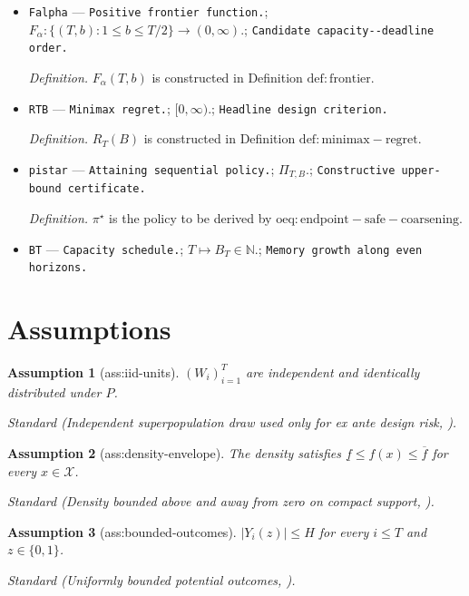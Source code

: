 \documentclass{article}
\newtheorem{assumption}{Assumption}
\begin{document}
\begin{itemize}
  \par\smallskip\noindent\emph{Definition.} \(\alpha=2\beta/d\).
  \item \texttt{Falpha} --- \texttt{Positive frontier function.}; \(F_\alpha:\{(T,b):1\le b\le T/2\}\to(0,\infty)\).; \texttt{Candidate capacity-\allowbreak{}-\allowbreak{}deadline order.}
  \par\smallskip\noindent\emph{Definition.} \(F_\alpha(T,b)\) is constructed in Definition \(\mathrm{def:frontier}\).
  \item \texttt{RTB} --- \texttt{Minimax regret.}; \([0,\infty)\).; \texttt{Headline design criterion.}
  \par\smallskip\noindent\emph{Definition.} \(R_T(B)\) is constructed in Definition \(\mathrm{def:minimax-regret}\).
  \item \texttt{pistar} --- \texttt{Attaining sequential policy.}; \(\Pi_{T,B}\).; \texttt{Constructive upper-\allowbreak{}bound certificate.}
  \par\smallskip\noindent\emph{Definition.} \(\pi^\star\) is the policy to be derived by \(\mathrm{oeq:endpoint-safe-coarsening}\).
  \item \texttt{BT} --- \texttt{Capacity schedule.}; \(T\mapsto B_T\in\mathbb N\).; \texttt{Memory growth along even horizons.}
\end{itemize}

\section{Assumptions}

\begin{assumption}[ass:iid-units]\label{ass:iid-units}
\((W_i)_{i=1}^T\) are independent and identically distributed under \(P\).
\par\smallskip\noindent\emph{Standard} (Independent superpopulation draw used only for ex ante design risk, \cite{bai2022optimality}).
\end{assumption}

\begin{assumption}[ass:density-envelope]\label{ass:density-envelope}
The density satisfies \(\underline f\le f(x)\le\overline f\) for every \(x\in\mathcal X\).
\par\smallskip\noindent\emph{Standard} (Density bounded above and away from zero on compact support, \cite{tsybakov2009introduction}).
\end{assumption}

\begin{assumption}[ass:bounded-outcomes]\label{ass:bounded-outcomes}
\(|Y_i(z)|\le H\) for every \(i\le T\) and \(z\in\{0,1\}\).
\par\smallskip\noindent\emph{Standard} (Uniformly bounded potential outcomes, \cite{hoeffding1963probability}).
\end{assumption}
\end{document}
